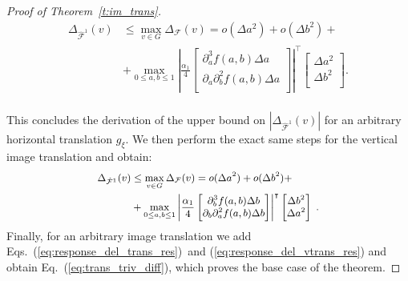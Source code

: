 \documentclass[10pt,journal,compsoc]{IEEEtran}
\newcommand{\hmF}{\hat{\mathcal{F}}}
\begin{document}
\begin{proof}[Proof of Theorem~\ref{t:im_trans}]
\begin{equation}
\begin{aligned}
		\Delta_{\hmF^1} (v) & \leq \max_{v \in G} \Delta_\mathcal{F} (v)  = o(\Delta a^2) + o(\Delta b^2) + \\
		& + 
		\max_{0 \leq a,b \leq 1} 
		\left| \frac{\alpha_1}{4}
		\begin{bmatrix}
		\partial^3_a f(a,b)\Delta a\\
		\partial_a\partial^2_b f(a,b) \Delta a\\
		\end{bmatrix}
		\right|^\intercal
		\begin{bmatrix}
		\Delta a^2 \\
		\Delta b^2 \\
		\end{bmatrix}. \\
		\end{aligned}
		\label{eq:response_del_trans_res}
		\end{equation}
		
		This concludes the derivation of the upper bound on $\left|\Delta_{\hmF^1} (v)\right|$ for an arbitrary horizontal translation $g_\xi$. We then perform the exact same steps for the vertical image translation and obtain:
		\begin{equation}
		\small
		\begin{aligned}
		\Delta_{\hmF^1} (v) & \leq \max_{v \in G} \Delta_\mathcal{F} (v)  = o(\Delta a^2) + o(\Delta b^2) + \\
		& + 
		\max_{0 \leq a,b \leq 1} 
		\left| \frac{\alpha_1}{4}
		\begin{bmatrix}
		\partial^3_b f(a,b)\Delta b\\
		\partial_b\partial^2_a f(a,b) \Delta b\\
		\end{bmatrix}
		\right|^\intercal
		\begin{bmatrix}
		\Delta b^2 \\
		\Delta a^2 \\
		\end{bmatrix}\;.\\
		\end{aligned}
		\label{eq:response_del_vtrans_res}
		\end{equation}
		\noindent
		Finally, for an arbitrary image translation we add  Eqs.~(\ref{eq:response_del_trans_res})~and (\ref{eq:response_del_vtrans_res}) and obtain Eq.~(\ref{eq:trans_triv_diff}), which proves the base case of the theorem.
		

\end{proof}
\end{document}
